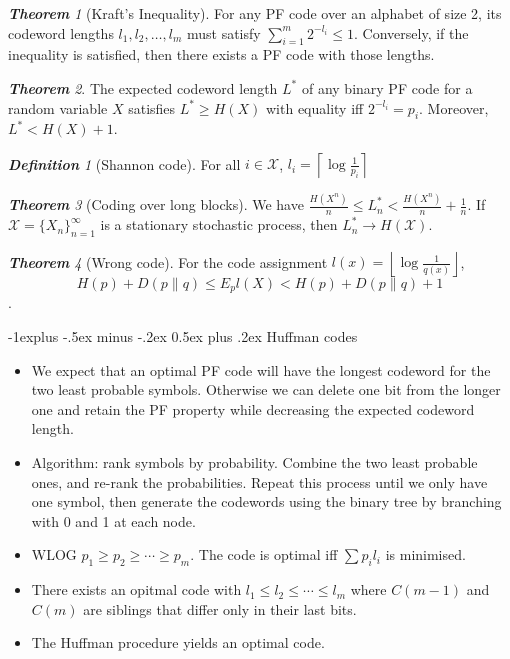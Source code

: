 \documentclass[frenchspacing,9pt,landscape,a4paper]{article}
\makeatletter
\renewcommand{\subsection}{\@startsection{subsection}{2}{0mm}%
                                {-1explus -.5ex minus -.2ex}%
                                {0.5ex plus .2ex}%
                                {\normalfont\normalsize\bfseries}}
\newcommand{\floor}[1]{\left\lfloor #1 \right\rfloor}
\newcommand{\ceiling}[1]{\left\lceil #1 \right\rceil}
\theoremstyle{remark}
\newtheorem*{thm}{\textbf{Theorem}}
\newtheorem*{defn}{\textbf{Definition}}
\makeatother
\begin{document}
\begin{multicols}{4}
\begin{thm}[Kraft's Inequality]
    For any PF code over an alphabet of size 2, its codeword lengths  $l_1,l_2,\dots,l_m$ must satisfy
    $\sum_{i=1}^m 2^{-l_i}\leq 1$. Conversely, if the inequality is satisfied, then there exists a PF code
    with those lengths.
\end{thm}
\begin{thm}
    The expected codeword length $L^*$ of any binary PF code for a random variable  $X$ satisfies  $L^*\geq
    H(X)$ with equality iff  $2^{-l_i}=p_i$. Moreover, $L^*<H(X)+1$.
\end{thm}
\begin{defn}[Shannon code]
    For all  $i\in\mathcal{X}$, $l_i=\ceiling{\log \frac{1}{p_i}}$
\end{defn}
\begin{thm}[Coding over long blocks]
    We have $\frac{H(X^n)}{n}\leq L_n^*<\frac{H(X^n)}{n}+\frac{1}{n}$. If
    $\mathcal{X}=\{X_n\}_{n=1}^\infty$ is a stationary stochastic process, then $L_n^*\to H(\mathcal{X})$.
\end{thm}
\begin{thm}[Wrong code]
    For the code assignment $l(x)=\floor{\log \frac{1}{q(x)}}$, \[H(p)+D(p\parallel q)\leq E_p
    l(X)<H(p)+D(p\parallel q)+1\].
\end{thm}
\subsection{Huffman codes}
\begin{itemize}
    \item We expect that an optimal PF code will have the longest codeword for the two least probable
        symbols. Otherwise we can delete one bit from the longer one and retain the PF property while
        decreasing the expected codeword length.
    \item Algorithm: rank symbols by probability. Combine the two least probable ones, and re-rank the
        probabilities. Repeat this process until we only have one symbol, then generate the codewords using
        the binary tree by branching with 0 and 1 at each node.
    \item WLOG $p_1\geq p_2\geq\cdots\geq p_m$. The code is optimal iff $\sum p_il_i$ is minimised.
    \item There exists an opitmal code with $l_1\leq l_2\leq\cdots\leq l_m$ where $C(m-1)$ and $C(m)$ are
        siblings that differ only in their last bits.
    \item The Huffman procedure yields an optimal code.
\end{itemize}

\end{multicols}
\end{document}
